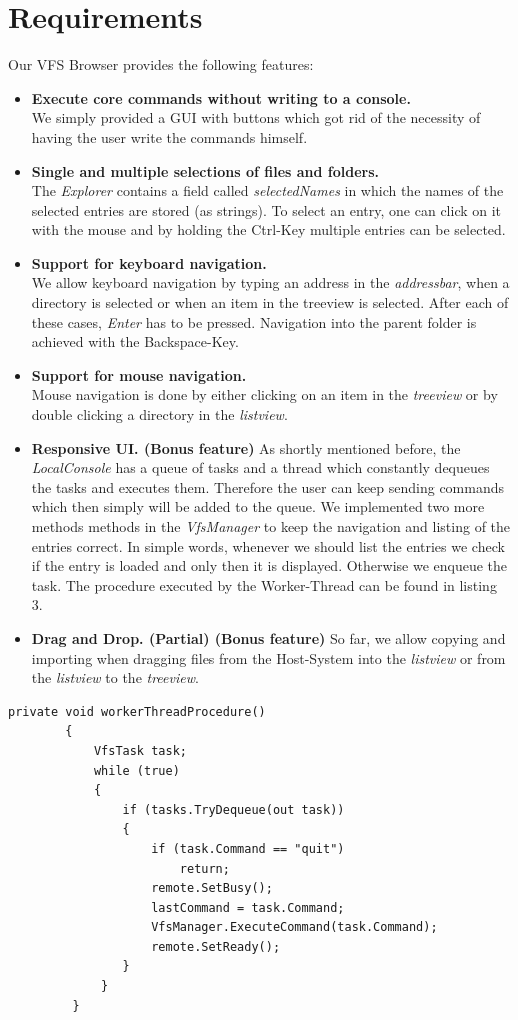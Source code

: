 \documentclass[a4paper,12pt]{article}
\begin{document}
\section{Requirements}
Our VFS Browser provides the following features:
\begin{itemize}
\item \textbf{Execute core commands without writing to a console.} \\
	We simply provided a GUI with buttons which got rid of the necessity of having the user write the commands himself.
\item \textbf{Single and multiple selections of files and folders.} \\
	The \emph{Explorer} contains a field called \emph{selectedNames} in which the names of the selected entries are stored (as strings). To select an 			entry, one can click on it with the mouse and by holding the Ctrl-Key multiple entries can be selected.
\item \textbf{Support for keyboard navigation.} \\
	We allow keyboard navigation by typing an address in the \emph{addressbar}, when a directory is selected or when an item in the treeview is selected. 			After 	each of these cases, \emph{Enter} has to be pressed. Navigation into the parent folder is achieved with the Backspace-Key.
\item \textbf{Support for mouse navigation.} \\
	Mouse navigation is done by either clicking on an item in the \emph{treeview} or by double clicking a directory in the \emph{listview}.
\item \textbf {Responsive UI. (Bonus feature)}
	As shortly mentioned before, the \emph{LocalConsole} has a queue of tasks and a thread which constantly dequeues the tasks and executes them. 		Therefore the user can keep sending commands which then simply will be added to the queue. We implemented two more methods methods in 			the \emph{VfsManager} to keep the navigation and listing of the entries correct. In simple words, whenever we should list the entries we check if 			the entry is 	loaded and only then it is displayed. Otherwise we enqueue the task. The procedure executed by the Worker-Thread can be found 			in listing 3.
\item \textbf{Drag and Drop. (Partial) (Bonus feature)}
	So far, we allow copying and importing when dragging files from the Host-System into the \emph{listview} or from the \emph{listview} to the 				\emph{treeview}.
\end{itemize}

\pagebreak

\begin{lstlisting}[label={lst:3},caption=Worker-Thread's Procedure]
        private void workerThreadProcedure()
        {
            VfsTask task;
            while (true)
            {
                if (tasks.TryDequeue(out task))
                {
                    if (task.Command == "quit")
                        return;
                    remote.SetBusy();
                    lastCommand = task.Command;
                    VfsManager.ExecuteCommand(task.Command);
                    remote.SetReady();
                }   
             }   
         }
\end{lstlisting}
\end{document}
